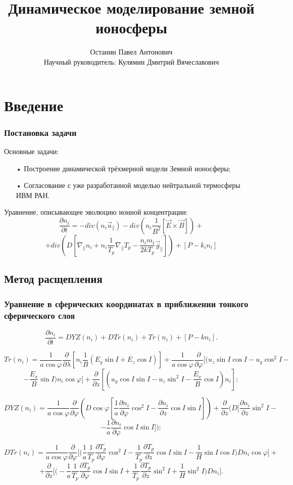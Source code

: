 \documentclass[9pt, apectratio=43,unicode]{beamer}
\title[Моделирование земной ионосферы]{Динамическое моделирование земной ионосферы}
\author[Останин П. А.]{Останин Павел Антонович \\ \vspace{1ex} Научный руководитель: Кулямин Дмитрий Вячеславович}
\date{}
\begin{document}
\begin{frame}[plain]
\titlepage
\end{frame}

\def\L{\mathcal{L}}

\section{Введение}
\begin{frame}\frametitle{Постановка задачи}
Основные задачи:
\begin{itemize}
\item[•] Построение динамической трёхмерной модели Земной ионосферы;
\item[•] Согласование с уже разработанной моделью нейтральной термосферы ИВМ РАН.
\end{itemize}

Уравнение, описывающее эволюцию ионной концентрации: $$\dfrac{\partial n_i}{\partial t} = -div(n_i \vec{u}_\parallel)-div\left(n_i\dfrac{1}{B^2}[\vec{E}\times \vec{B}] \right)+$$ $$+div\left(D\left[\nabla_\parallel n_i +n_i\dfrac{1}{T_p}\nabla_\parallel T_p - \dfrac{n_i m_i}{2kT_p}\vec{g}_\parallel\right]\right)+[P-k_in_i]$$
\end{frame}


\subsection{Метод расщепления}
\begin{frame}\frametitle{Уравнение в сферических координатах в приближении тонкого сферического слоя}

$$\dfrac{\partial n_i}{\partial t} = DYZ(n_i)+DTr(n_i)+Tr(n_i)+[P-kn_i].$$

$$Tr(n_i) = \dfrac{1}{a\cos\varphi}\dfrac{\partial}{\partial\lambda}\left[n_i\dfrac{1}{B}(E_y\sin I + E_z\cos I)\right]+\dfrac{1}{a\cos\varphi}\dfrac{\partial}{\partial\varphi}\bigg[\bigg(u_z\sin I \cos I - u_y\cos^2 I -$$ $$- \dfrac{E_x}{B}\sin I\bigg)n_i\cos\varphi\bigg]+\dfrac{\partial}{\partial z}\left[\left(u_y\cos I \sin I -u_z\sin^2 I - \dfrac{E_x}{B}\cos I\right)n_i\right];$$

$$DYZ(n_i) = \dfrac{1}{a\cos\varphi}\dfrac{\partial}{\partial\varphi}\left(D\cos\varphi\left[\dfrac{1}{a}\dfrac{\partial n_i}{\partial\varphi} \cos^2 I -\dfrac{\partial n_i}{\partial z}\cos I\sin I\right]\right)+ \dfrac{\partial}{\partial z}\bigg(D\bigg[\dfrac{\partial n_i}{\partial z}\sin^2 I -$$ $$- \dfrac{1}{a}\dfrac{\partial n_i}{\partial\varphi}\cos I \sin I\bigg]\bigg);$$ 

$$DTr(n_i) = \dfrac{1}{a\cos\varphi}\dfrac{\partial}{\partial \varphi}\bigg[\bigg(\dfrac{1}{a}\dfrac{1}{T_p}\dfrac{\partial T_p}{\partial\varphi}\cos^2 I-\dfrac{1}{T_p}\dfrac{\partial T_p}{\partial z}\cos I \sin I - \dfrac{1}{H}\sin I \cos I\bigg)Dn_i\cos\varphi\bigg] +$$ $$+ \dfrac{\partial}{\partial z}\bigg[\bigg(-\dfrac{1}{a}\dfrac{1}{T_p}\dfrac{\partial T_p}{\partial \varphi}\cos I \sin I +\dfrac{1}{T_p}\dfrac{\partial T_p}{\partial z}\sin^2 I+\dfrac{1}{H}\sin^2I\bigg)Dn_i\bigg].$$
\end{frame}
\end{document}
